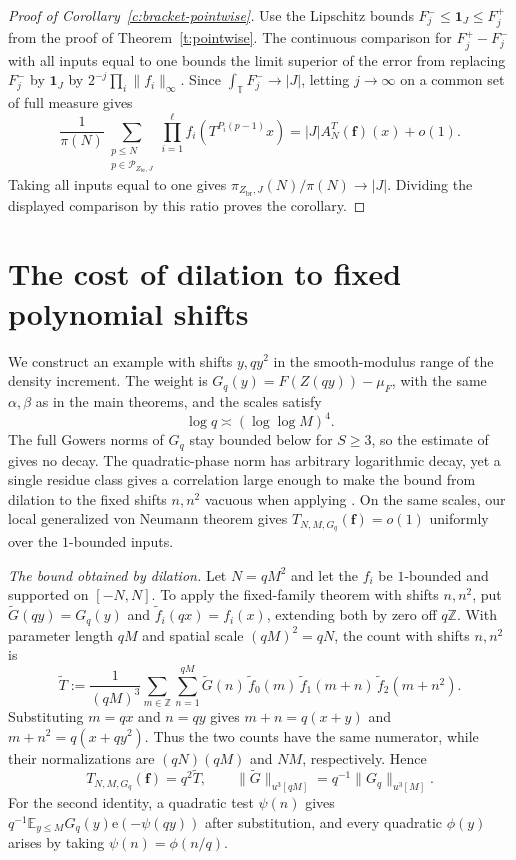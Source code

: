\documentclass[12pt]{amsart}
\newcommand{\1}{\mathbf 1}
\newcommand{\e}{\mathrm e}
\theoremstyle{definition}
\begin{document}
\begin{proof}[Proof of Corollary~\ref{c:bracket-pointwise}]
Use the Lipschitz bounds $F_j^-\leq\mathbf1_J\leq F_j^+$ from the
proof of Theorem~\ref{t:pointwise}. The continuous comparison for
$F_j^+-F_j^-$ with all inputs equal to one bounds the limit superior
of the error from replacing $F_j^-$ by $\mathbf1_J$ by
$2^{-j}\prod_i\|f_i\|_\infty$. Since $\int_{\mathbb T}F_j^-\to |J|$,
letting $j\to\infty$ on a common set of full measure gives
\[
 \frac1{\pi(N)}
 \sum_{\substack{p\leq N\\p\in\mathcal P_{Z_{\mathrm{br}},J}}}
 \prod_{i=1}^{\ell}f_i(T^{P_i(p-1)}x)
 = |J|A_N^T(\mathbf f)(x)+o(1).
\]
Taking all inputs equal to one gives
$\pi_{Z_{\mathrm{br}},J}(N)/\pi(N)\to |J|$. Dividing the displayed
comparison by this ratio proves the corollary.
\end{proof}

\appendix

\section{The cost of dilation to fixed polynomial shifts}
\label{s:why-Cq}

We construct an example with shifts $y,qy^2$ in the smooth-modulus
range of the density increment. The weight is
$G_q(y)=F(Z(qy))-\mu_F$, with the same $\alpha,\beta$ as in the
main theorems, and the scales satisfy
$$\log q\asymp(\log\log M)^4.$$
The full Gowers norms of $G_q$ stay bounded below for $S\geq3$,
so the estimate of \cite[Proposition~3.3]{KMTT} gives no decay.
The quadratic-phase norm has arbitrary logarithmic decay, yet
a single residue class gives a correlation large enough to make
the bound from dilation to the fixed shifts $n,n^2$ vacuous
when applying \cite[Theorem~4.1]{Teravainen}. On the same scales,
our local generalized von Neumann theorem gives
$T_{N,M,G_q}(\mathbf f)=o(1)$ uniformly over the $1$-bounded
inputs.

\medskip
\noindent\emph{The bound obtained by dilation.}
Let \(N=qM^2\) and let the \(f_i\) be \(1\)-bounded and supported
on \([-N,N]\). To apply the fixed-family theorem with shifts
\(n,n^2\), put \(\widetilde G(qy)=G_q(y)\) and
\(\widetilde f_i(qx)=f_i(x)\), extending both by zero off
\(q\mathbb Z\). With parameter length \(qM\) and spatial scale \((qM)^2=qN\),
the count with shifts \(n,n^2\) is
\[
 \widetilde T
 :=\frac{1}{(qM)^3}
 \sum_{m\in\mathbb Z}\sum_{n=1}^{qM}
 \widetilde G(n)\,\widetilde f_0(m)\,
 \widetilde f_1(m+n)\,\widetilde f_2(m+n^2).
\]
Substituting \(m=qx\) and
\(n=qy\) gives \(m+n=q(x+y)\) and \(m+n^2=q(x+qy^2)\).
Thus the two counts have the same numerator, while their
normalizations are \((qN)(qM)\) and \(NM\), respectively. Hence
\begin{equation}\label{e:lift-form}
 T_{N,M,G_q}(\mathbf f)=q^2\widetilde T,
 \qquad
 \|\widetilde G\|_{u^3[qM]}=q^{-1}\|G_q\|_{u^3[M]}.
\end{equation}
For the second identity, a quadratic test \(\psi(n)\) gives
\(q^{-1}\mathbb E_{y\leq M}G_q(y)\e(-\psi(qy))\) after
substitution, and every quadratic \(\phi(y)\) arises by taking
\(\psi(n)=\phi(n/q)\).
\end{document}
